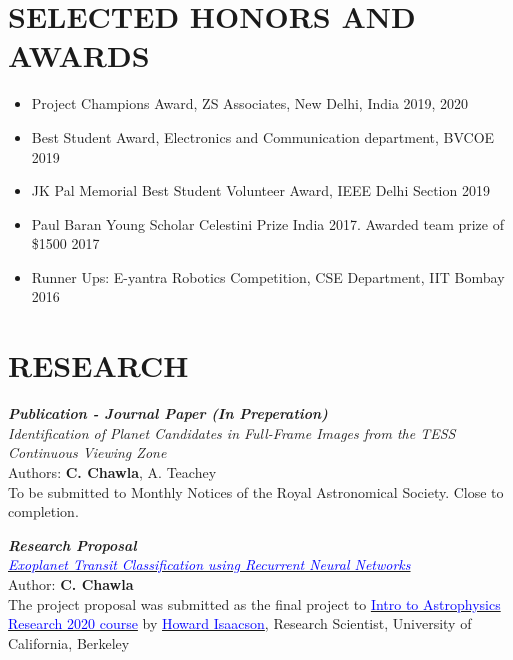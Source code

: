 \documentclass[11pt]{res} %
\newcommand{\titlegap}{5pt} %
\newcommand{\sectgap}{0.05in} %
\begin{document}
\begin{resume}
\vspace{0.1in}
\hline


\section{SELECTED HONORS AND AWARDS}

\vspace{0.2in} 

\begin{itemize}
    \item Project Champions Award, ZS Associates, New Delhi, India \hfill 2019, 2020
    \item Best Student Award, Electronics and Communication department, BVCOE \hfill 2019
    \item{}JK Pal Memorial Best Student Volunteer Award, IEEE Delhi Section \hfill 2019
    \item Paul Baran Young Scholar Celestini Prize India 2017. Awarded team prize of \$1500 \hfill 2017
    \item Runner Ups: E-yantra Robotics Competition, CSE Department, IIT Bombay \hfill 2016
\end{itemize}

\vspace{\sectgap} 

\hline



\section{\large RESEARCH}

\vspace{\titlegap}
\textbf{\textit{Publication - Journal Paper (In Preperation)}}\\
\textit{Identification of Planet Candidates in Full-Frame Images from the TESS Continuous Viewing Zone}\\
Authors: \textbf{C. Chawla}, A. Teachey \\
To be submitted to Monthly Notices of the Royal Astronomical Society. Close to completion.

\textbf{\textit{Research Proposal}}\\
\textit{\href{https://drive.google.com/file/d/1Dy6xjWMH5EVmVreHnUj9QBFsuitt-dDZ/view?usp=sharing}{\textcolor{blue}{Exoplanet Transit Classification using Recurrent Neural Networks}}}\\ 
Author: \textbf{C. Chawla} \\
The project proposal was submitted as the final project to \href{https://github.com/howardisaacson/Intro-to-Astro-2020}{\textcolor{blue}{Intro to Astrophysics Research 2020 course}} by \href{https://hisaacson2.wixsite.com/website}{\textcolor{blue}{Howard Isaacson}}, Research Scientist, University of California, Berkeley


\end{resume}
\end{document}
